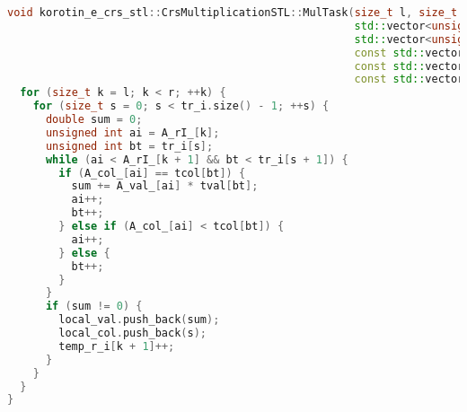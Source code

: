 \documentclass[a4paper,12pt]{article}
\begin{document}
\begin{lstlisting}[language=C++]
void korotin_e_crs_stl::CrsMultiplicationSTL::MulTask(size_t l, size_t r, std::vector<double> &local_val,
                                                      std::vector<unsigned int> &local_col,
                                                      std::vector<unsigned int> &temp_r_i,
                                                      const std::vector<unsigned int> &tr_i,
                                                      const std::vector<unsigned int> &tcol,
                                                      const std::vector<double> &tval) {
  for (size_t k = l; k < r; ++k) {
    for (size_t s = 0; s < tr_i.size() - 1; ++s) {
      double sum = 0;
      unsigned int ai = A_rI_[k];
      unsigned int bt = tr_i[s];
      while (ai < A_rI_[k + 1] && bt < tr_i[s + 1]) {
        if (A_col_[ai] == tcol[bt]) {
          sum += A_val_[ai] * tval[bt];
          ai++;
          bt++;
        } else if (A_col_[ai] < tcol[bt]) {
          ai++;
        } else {
          bt++;
        }
      }
      if (sum != 0) {
        local_val.push_back(sum);
        local_col.push_back(s);
        temp_r_i[k + 1]++;
      }
    }
  }
}
\end{lstlisting}
\end{document}
